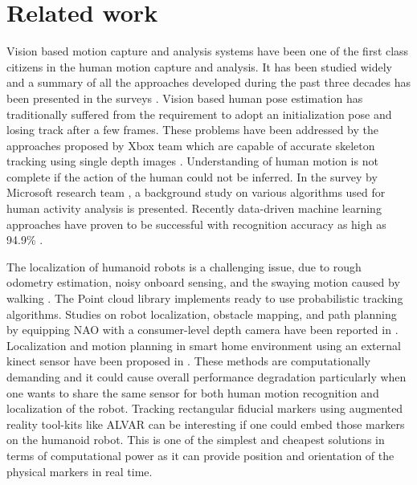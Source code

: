 \documentclass{llncs}
\begin{document}
\section{Related work}
\quad Vision based motion capture and analysis systems have been one of the first class citizens in the human motion capture and analysis. It has been studied widely and a summary of all the approaches developed during the past three decades has been presented in the surveys \cite{moeslund2006survey}\cite{poppe2007vision}. Vision based human pose estimation has traditionally suffered from the requirement to adopt an initialization pose and losing track after a few frames. These problems have been addressed by the approaches proposed by Xbox \cite{Kinect2014} team which are capable of accurate skeleton tracking using single depth images \cite{shotton2013efficient}. Understanding of human motion is not complete if the action of the human could not be inferred. In the survey by Microsoft research team \cite{han2013enhanced}, a background study on various algorithms used for human activity analysis is presented. Recently data-driven machine learning approaches have proven to be successful with recognition accuracy as high as 94.9\% \cite{Kinect2014}.
	
	The localization of humanoid robots is a challenging issue, due to rough odometry estimation, noisy onboard sensing, and the swaying motion caused by walking \cite{cervera2012localization}. The Point cloud library \cite{rusu20113d} implements ready to use probabilistic tracking algorithms. Studies on robot localization, obstacle mapping, and path planning by equipping NAO with a consumer-level depth camera have been reported in \cite{maier2012real}. Localization and motion planning in smart home environment using an external kinect sensor have been proposed in \cite{cervera2012localization}. These methods are computationally demanding and it could cause overall performance degradation particularly when one wants to share the same sensor for both human motion recognition and localization of the robot. Tracking rectangular fiducial markers using augmented reality tool-kits like ALVAR \cite{ALVAR} can be interesting if one could embed those markers on the humanoid robot. This is one of the simplest and cheapest solutions in terms of computational power as it can provide position and orientation of the physical markers in real time.
	
\end{document}
